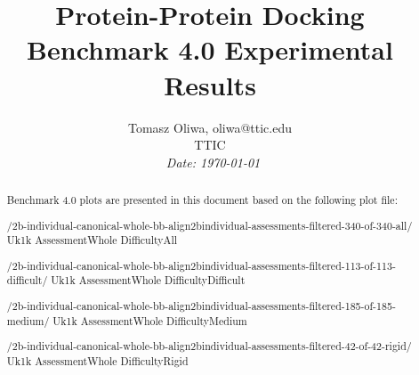 \documentclass[12pt]{article}
\begin{document}
 
\title{Protein-Protein Docking Benchmark 4.0 Experimental Results}
 
\author{Tomasz Oliwa, oliwa@ttic.edu \\ TTIC \\ 
{\small\em \  Date:  \today }}
\date{}
\maketitle
 
\begin{abstract}
Benchmark 4.0 plots are presented in this document based on the following plot file:

/2b-individual-canonical-whole-bb-align2bindividual-assessments-filtered-340-of-340-all/ Uk1k AssessmentWhole DifficultyAll

/2b-individual-canonical-whole-bb-align2bindividual-assessments-filtered-113-of-113-difficult/ Uk1k AssessmentWhole DifficultyDifficult

/2b-individual-canonical-whole-bb-align2bindividual-assessments-filtered-185-of-185-medium/ Uk1k AssessmentWhole DifficultyMedium

/2b-individual-canonical-whole-bb-align2bindividual-assessments-filtered-42-of-42-rigid/ Uk1k AssessmentWhole DifficultyRigid
 
\end{abstract}
 
\fancyfoot[C]{\thepage}
 

\newpage
 
\end{document}
